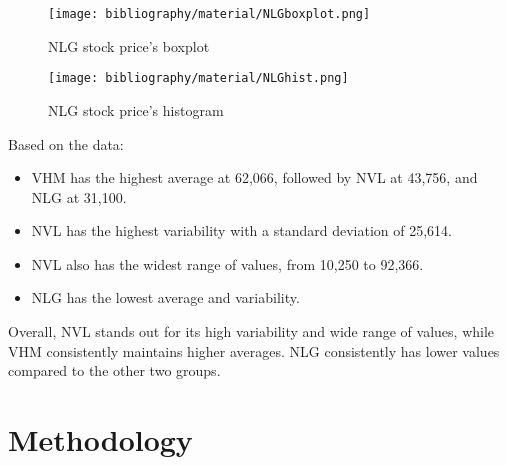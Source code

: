 \documentclass{ieeeojies}
\begin{document}
\begin{figure}[H]
\centering
\begin{minipage}{0.23\textwidth}
\centering
\texttt{[image: bibliography/material/NLGboxplot.png]}
\caption{NLG stock price's boxplot}
\label{fig:1}
\end{minipage}
\hfill
\begin{minipage}{0.23\textwidth}
\centering
\texttt{[image: bibliography/material/NLGhist.png]}
\caption{NLG stock price's histogram}
\label{fig:2}
\end{minipage}
\end{figure}
Based on the data:
\begin{itemize}
\item VHM has the highest average at 62,066, followed by NVL at 43,756, and NLG at
31,100.
\item NVL has the highest variability with a standard deviation of 25,614.
\item NVL also has the widest range of values, from 10,250 to 92,366.
\item NLG has the lowest average and variability.
\end{itemize}
Overall, NVL stands out for its high variability and wide range of values, while VHM consistently maintains higher averages. NLG consistently has lower values compared to the other two groups.

\section{Methodology}
\end{document}
